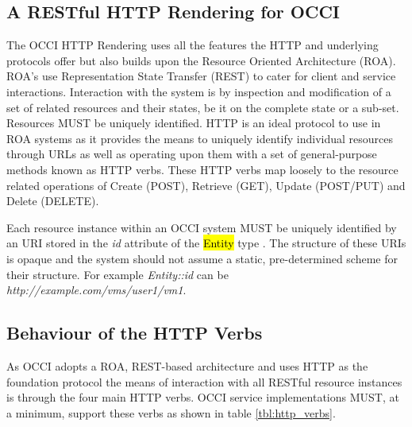 \documentclass[10pt,a4paper]{article}
\begin{document}
\subsection{A RESTful HTTP Rendering for OCCI}

The OCCI HTTP Rendering uses
all the features the HTTP and underlying protocols offer but also
builds upon the Resource Oriented Architecture (ROA). ROA's use
Representation State Transfer (REST) \cite{REST_Fielding} to cater for
client and service interactions. Interaction with the system is by
inspection and modification of a set of related resources and their
states, be it on the complete state or a sub-set. Resources MUST be
uniquely identified. HTTP is an ideal protocol to use in ROA systems
as it provides the means to uniquely identify individual resources
through URLs as well as operating upon them with a set of
general-purpose methods known as HTTP verbs. These HTTP verbs map
loosely to the resource related operations of Create (POST), Retrieve
(GET), Update (POST/PUT) and Delete (DELETE).

Each resource instance within an OCCI system MUST be uniquely identified by an
URI stored in the {\em id} attribute of the \hl{Entity} type
\cite{occi:core}.
%
The structure of these URIs is opaque and the system should not assume a
static, pre-determined scheme for their structure. For example
\emph{Entity::id} can be \emph{http://example.com/vms/user1/vm1}.

\subsection{Behaviour of the HTTP Verbs}
As OCCI adopts a ROA, REST-based architecture and uses HTTP as the
foundation protocol the means of interaction with all RESTful resource
instances is through the four main HTTP verbs. OCCI service
implementations MUST, at a minimum, support these verbs as shown in
table \ref{tbl:http_verbs}.
\end{document}
